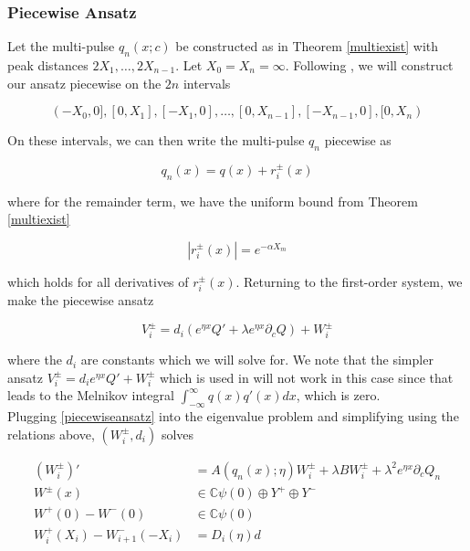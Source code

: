 \documentclass[12pt]{article}
\def\C{{\mathbb C}}
\begin{document}
\subsubsection{Piecewise Ansatz}

Let the multi-pulse $q_n(x; c)$ be constructed as in Theorem \ref{multiexist} with peak distances $2 X_1, \dots, 2 X_{n-1}$. Let $X_0 = X_n = \infty$. Following \cite{Sandstede1998}, we will construct our ansatz piecewise on the $2n$ intervals

\[
(-X_0, 0], [0, X_1], [-X_1, 0], \dots, [0, X_{n-1}], [-X_{n-1}, 0], [0, X_n) 
\]

On these intervals, we can then write the multi-pulse $q_n$ piecewise as

\[
q_n(x) = q(x) + r_i^\pm(x)
\]

where for the remainder term, we have the uniform bound from Theorem \ref{multiexist}

\begin{equation}\label{ripmbound}
|r_i^\pm(x)| = e^{-\alpha X_m} 
\end{equation}

which holds for all derivatives of $r_i^\pm(x)$. Returning to the first-order system, we make the piecewise ansatz 

\begin{equation}\label{piecewiseansatz}
V_i^\pm = d_i (e^{\eta x} Q' + \lambda e^{\eta x} \partial_c Q) + W_i^\pm
\end{equation}

where the $d_i$ are constants which we will solve for. We note that the simpler ansatz $V_i^\pm = d_i e^{\eta x} Q' + W_i^\pm$ which is used in \cite{Sandstede1998}will not work in this case since that leads to the Melnikov integral $\int_{-\infty}^\infty q(x) q'(x) dx$, which is zero.\\

Plugging \eqref{piecewiseansatz} into the eigenvalue problem and simplifying using the relations above, $(W_i^\pm, d_i)$ solves

\begin{align*}
(W_i^\pm)' &= A(q_n(x); \eta) W_i^\pm + \lambda B W_i^\pm + \lambda^2 e^{\eta x} \partial_c Q_n \\
W^\pm(x) &\in \C \psi(0) \oplus Y^+ \oplus Y^- \\
W^+(0) - W^-(0) &\in \C \psi(0) \\
W_i^+(X_i) - W_{i+1}^-(-X_i) &= D_i(\eta) d
\end{align*}
\end{document}
